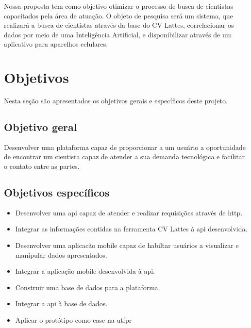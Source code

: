 Nossa proposta tem como objetivo otimizar o processo de busca de cientistas capacitados pela área de atuação. O objeto de pesquisa será um sistema, que realizará a busca de cientistas através da base do CV Lattes, correlacionar os dados por meio de uma Inteligência Artificial, e disponibilizar através de um aplicativo para aparelhos celulares.

\section{Objetivos}\label{sec:objetivos}

Nesta seção são apresentados os objetivos gerais e específicos deste projeto.

\subsection{Objetivo geral}\label{subsec:objetivoGeral}

Desenvolver uma plataforma capaz de proporcionar a um usuário a oportunidade de encontrar um cientista capaz de atender a sua demanda tecnológica e facilitar o contato entre as partes.

\subsection{Objetivos específicos}\label{subsec:objetivosEspecificos}

\begin{itemize}
    \item Desenvolver uma \gls{api} capaz de atender e realizar requisições através de \gls{http}.
    \item Integrar as informações contidas na ferramenta CV Lattes à \gls{api} desenvolvida.
    \item Desenvolver uma aplicacão mobile capaz de habiltar usuários a visualizar e manipular dados apresentados.
    \item Integrar a aplicação mobile desenvolvida à \gls{api}.
    \item Construir uma base de dados para a plataforma.
    \item Integrar a \gls{api} à base de dados.
    \item Aplicar o protótipo como case na \gls{utfpr}
\end{itemize}

